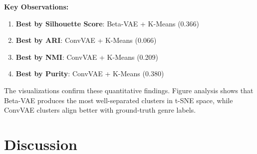 \documentclass{article}
\begin{document}
\textbf{Key Observations:}
\begin{enumerate}
    \item \textbf{Best by Silhouette Score}: Beta-VAE + K-Means (0.366)
    \item \textbf{Best by ARI}: ConvVAE + K-Means (0.066)
    \item \textbf{Best by NMI}: ConvVAE + K-Means (0.209)
    \item \textbf{Best by Purity}: ConvVAE + K-Means (0.380)
\end{enumerate}

The visualizations confirm these quantitative findings. Figure analysis shows that Beta-VAE produces the most well-separated clusters in t-SNE space, while ConvVAE clusters align better with ground-truth genre labels.

\section{Discussion}
\end{document}
